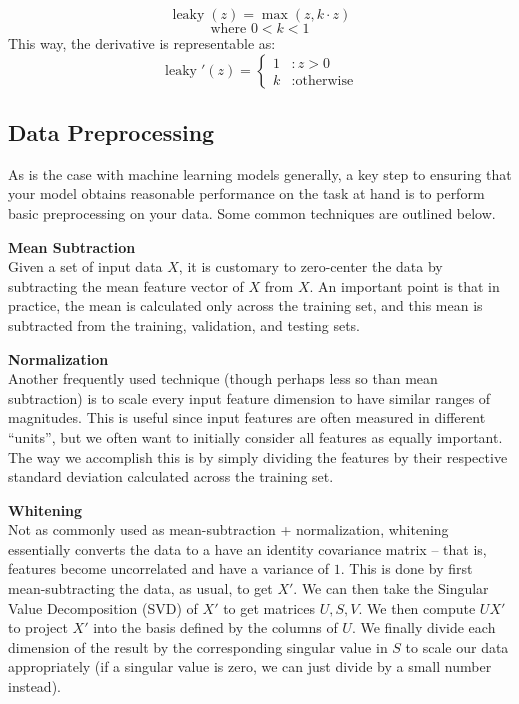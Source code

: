 \documentclass{tufte-handout}
\begin{document}
{$$\operatorname{leaky}(z) = \operatorname{max}(z, k\cdot z)$$
$$\text{where } 0<k<1$$
This way, the derivative is representable as:
\begin{displaymath}
    \operatorname{leaky}'(z) = \left\{
     \begin{array}{cl}
       1 & : z > 0\\
       k & : \text{otherwise}
     \end{array}
   \right.
\end{displaymath} 

\subsection{Data Preprocessing}
As is the case with machine learning models generally, a key step to ensuring that your model obtains reasonable performance on the task at hand is to perform basic preprocessing on your data. Some common techniques are outlined below.\\
\vspace{6mm}

\noindent\textbf{Mean Subtraction}\\

\noindent{}Given a set of input data $X$, it is customary to zero-center the data by subtracting the mean feature vector of $X$ from $X$. An important point is that in practice, the mean is calculated only across the training set, and this mean is subtracted from the training, validation, and testing sets.\\
\vspace{6mm}

\noindent\textbf{Normalization}\\

\noindent{}Another frequently used technique (though perhaps less so than mean subtraction) is to scale every input feature dimension to have similar ranges of magnitudes. This is useful since input features are often measured in different ``units'', but we often want to initially consider all features as equally important. The way we accomplish this is by simply dividing the features by their respective standard deviation calculated across the training set.\\
\vspace{6mm}

\noindent\textbf{Whitening}\\

\noindent{}Not as commonly used as mean-subtraction + normalization, whitening essentially converts the data to a have an identity covariance matrix -- that is, features become uncorrelated and have a variance of $1$.  This is done by first mean-subtracting the data, as usual, to get $X'$. We can then take the Singular Value Decomposition (SVD) of $X'$ to get matrices $U, S, V$. We then compute $UX'$ to project  $X'$ into the basis defined by the columns of $U$. We finally divide each dimension of the result by the corresponding singular value in $S$ to scale our data appropriately (if a singular value is zero, we can just divide by a small number instead).


}
\end{document}
